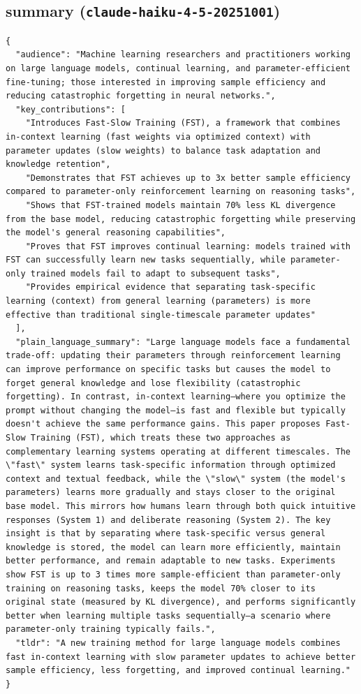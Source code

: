 \documentclass[11pt]{article}
\begin{document}
\subsection*{summary (\texttt{claude-haiku-4-5-20251001})}
\begin{verbatim}
{
  "audience": "Machine learning researchers and practitioners working on large language models, continual learning, and parameter-efficient fine-tuning; those interested in improving sample efficiency and reducing catastrophic forgetting in neural networks.",
  "key_contributions": [
    "Introduces Fast-Slow Training (FST), a framework that combines in-context learning (fast weights via optimized context) with parameter updates (slow weights) to balance task adaptation and knowledge retention",
    "Demonstrates that FST achieves up to 3x better sample efficiency compared to parameter-only reinforcement learning on reasoning tasks",
    "Shows that FST-trained models maintain 70% less KL divergence from the base model, reducing catastrophic forgetting while preserving the model's general reasoning capabilities",
    "Proves that FST improves continual learning: models trained with FST can successfully learn new tasks sequentially, while parameter-only trained models fail to adapt to subsequent tasks",
    "Provides empirical evidence that separating task-specific learning (context) from general learning (parameters) is more effective than traditional single-timescale parameter updates"
  ],
  "plain_language_summary": "Large language models face a fundamental trade-off: updating their parameters through reinforcement learning can improve performance on specific tasks but causes the model to forget general knowledge and lose flexibility (catastrophic forgetting). In contrast, in-context learning—where you optimize the prompt without changing the model—is fast and flexible but typically doesn't achieve the same performance gains. This paper proposes Fast-Slow Training (FST), which treats these two approaches as complementary learning systems operating at different timescales. The \"fast\" system learns task-specific information through optimized context and textual feedback, while the \"slow\" system (the model's parameters) learns more gradually and stays closer to the original base model. This mirrors how humans learn through both quick intuitive responses (System 1) and deliberate reasoning (System 2). The key insight is that by separating where task-specific versus general knowledge is stored, the model can learn more efficiently, maintain better performance, and remain adaptable to new tasks. Experiments show FST is up to 3 times more sample-efficient than parameter-only training on reasoning tasks, keeps the model 70% closer to its original state (measured by KL divergence), and performs significantly better when learning multiple tasks sequentially—a scenario where parameter-only training typically fails.",
  "tldr": "A new training method for large language models combines fast in-context learning with slow parameter updates to achieve better sample efficiency, less forgetting, and improved continual learning."
}
\end{verbatim}
\end{document}
